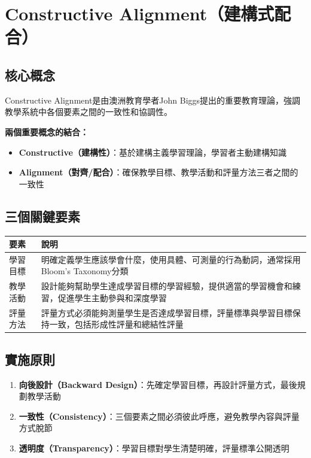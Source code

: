 \documentclass[12pt,a4paper]{article}
\begin{document}
\section{Constructive Alignment（建構式配合）}

\subsection{核心概念}

Constructive Alignment是由澳洲教育學者John Biggs提出的重要教育理論，強調教學系統中各個要素之間的一致性和協調性。

\textbf{兩個重要概念的結合：}
\begin{itemize}[nosep]
    \item \textbf{Constructive（建構性）}：基於建構主義學習理論，學習者主動建構知識
    \item \textbf{Alignment（對齊/配合）}：確保教學目標、教學活動和評量方法三者之間的一致性
\end{itemize}

\subsection{三個關鍵要素}

\begin{longtable}{p{4cm}p{10cm}}
\toprule
\textbf{要素} & \textbf{說明} \\
\midrule
\endhead
學習目標 & 明確定義學生應該學會什麼，使用具體、可測量的行為動詞，通常採用Bloom's Taxonomy分類 \\
教學活動 & 設計能夠幫助學生達成學習目標的學習經驗，提供適當的學習機會和練習，促進學生主動參與和深度學習 \\
評量方法 & 評量方式必須能夠測量學生是否達成學習目標，評量標準與學習目標保持一致，包括形成性評量和總結性評量 \\
\bottomrule
\end{longtable}

\subsection{實施原則}

\begin{enumerate}
    \item \textbf{向後設計（Backward Design）}：先確定學習目標，再設計評量方式，最後規劃教學活動
    \item \textbf{一致性（Consistency）}：三個要素之間必須彼此呼應，避免教學內容與評量方式脫節
    \item \textbf{透明度（Transparency）}：學習目標對學生清楚明確，評量標準公開透明
\end{enumerate}
\end{document}
